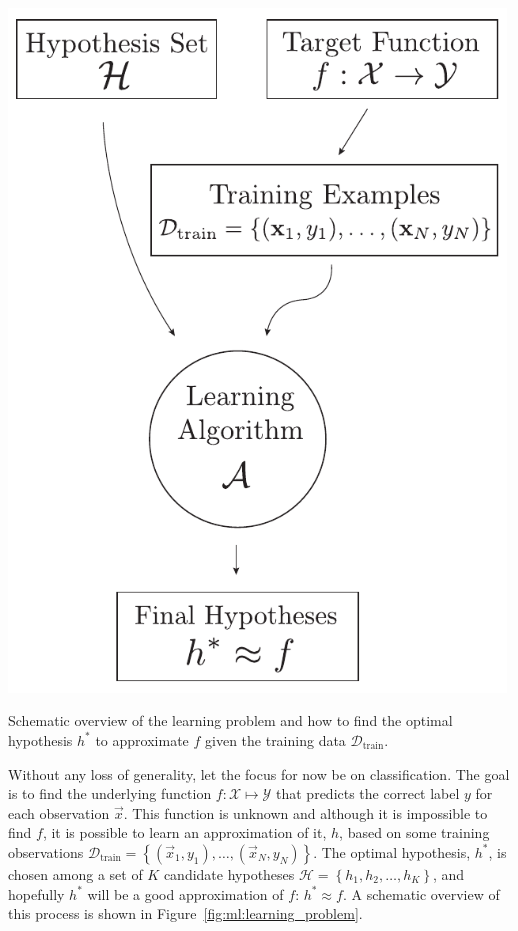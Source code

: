 \begin{marginfigure}
  \includegraphics[width=0.99\textwidth]{figures/learning_problem/learning_problem.pdf}
  \caption[The Learning Problem]
    {Schematic overview of the learning problem and how to find the optimal hypothesis $h^*$ to approximate $f$ given the training data $\mathcal{D}_\mathrm{train}$.
    }
  \label{fig:ml:learning_problem}
\end{marginfigure}

Without any loss of generality, let the focus for now be on classification. The goal is to find the underlying  function $f: \mathcal{X} \mapsto \mathcal{Y}$ that predicts the correct label $y$ for each observation $\vec{x}$. This function is unknown and although it is impossible to find $f$, it is possible to learn an approximation of it, $h$, based on some training observations $\mathcal{D}_\mathrm{train} = \left \{(\vec{x}_1, y_1), \dots, (\vec{x}_N, y_N) \right\}$. The optimal hypothesis, $h^*$, is chosen among a set of $K$ candidate hypotheses $\mathcal{H} = \left\{h_1, h_2, \ldots, h_K  \right\}$, and hopefully $h^*$ will be a good approximation of $f$: $h^* \approx f$. A schematic overview of this process is shown in Figure~\ref{fig:ml:learning_problem}. 

